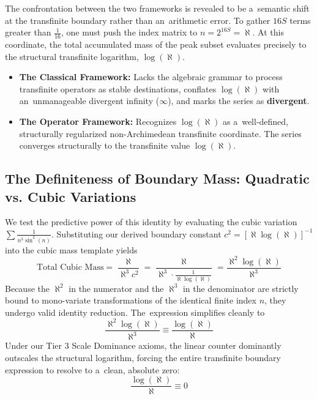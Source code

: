 \documentclass[11pt,a4paper]{article}
\theoremstyle{definition}
\theoremstyle{noperiod}
\begin{document}
The confrontation between the two frameworks is revealed to be a~semantic shift at the transfinite boundary rather than an~arithmetic error. To gather $16S$ terms greater than $\frac{1}{16}$, one must push the index matrix to $n = 2^{16S} = \aleph$. At this coordinate, the total accumulated mass of the peak subset evaluates precisely to the structural transfinite logarithm, $\log(\aleph)$.
\begin{itemize}
\item \textbf{The Classical Framework:} Lacks the algebraic grammar to process transfinite operators as stable destinations, conflates $\log(\aleph)$ with an~unmanageable divergent infinity ($\infty$), and marks the series as \textbf{divergent}.
\item \textbf{The Operator Framework:} Recognizes $\log(\aleph)$ as a~well-defined, structurally regularized non-Archimedean transfinite coordinate. The series converges structurally to the transfinite value $\log(\aleph)$.
\end{itemize}

\subsection{The Definiteness of Boundary Mass: Quadratic vs. Cubic Variations}

We test the predictive power of this identity by evaluating the cubic variation $\sum \frac{1}{n^3 \sin^2(n)}$.
Substituting our derived boundary constant $c^2 = [\aleph \log(\aleph)]^{-1}$ into the cubic mass template yields
\begin{equation}
\text{Total Cubic Mass} = \frac{\aleph}{\aleph^3 c^2} = \frac{\aleph}{\aleph^3 \cdot \frac{1}{\aleph \log(\aleph)}} = \frac{\aleph^2 \log(\aleph)}{\aleph^3}
\end{equation}
Because the $\aleph^2$ in the numerator and the $\aleph^3$ in the denominator are strictly bound to mono-variate transformations of the identical finite index $n$, they undergo valid identity reduction.
The~expression simplifies cleanly to
\begin{equation}
\frac{\aleph^2 \log(\aleph)}{\aleph^3} \equiv \frac{\log(\aleph)}{\aleph}
\end{equation}
Under our Tier 3 Scale Dominance axioms, the linear counter dominantly outscales the structural logarithm, forcing the entire transfinite boundary expression to resolve to a~clean, absolute zero:
\begin{equation}
\frac{\log(\aleph)}{\aleph} \equiv 0
\end{equation}
\end{document}
